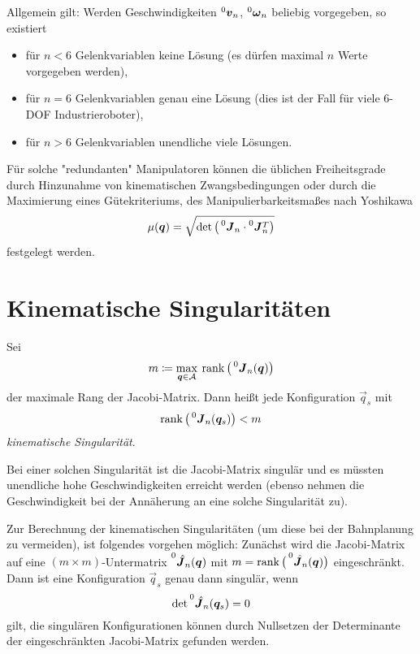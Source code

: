		Allgemein gilt: Werden Geschwindigkeiten \( \prescript{0}{}{\bm{v}}_n \), \( \prescript{0}{}{\bm{\omega}}_n \) beliebig vorgegeben, so existiert
		\begin{itemize}
			\item für \( n < 6 \) Gelenkvariablen \iA keine Lösung (es dürfen maximal \(n\) Werte vorgegeben werden),
			\item für \( n = 6 \) Gelenkvariablen \iA genau eine Lösung (dies ist der Fall für viele \num{6}-DOF Industrieroboter),
			\item für \( n > 6 \) Gelenkvariablen \iA unendliche viele Lösungen.
		\end{itemize}
		Für solche "redundanten" Manipulatoren können die üblichen Freiheitsgrade \zB durch Hinzunahme von kinematischen Zwangsbedingungen oder durch die Maximierung eines Gütekriteriums, \zB des Manipulierbarkeitsmaßes nach Yoshikawa
		\begin{equation*}
			\mu(\bm{q}) = \sqrt{\det \big( \prescript{0}{}{\bm{J}}_n \cdot \prescript{0}{}{\bm{J}}_n^T \big)}
		\end{equation*}
		festgelegt werden.

	\section{Kinematische Singularitäten}
		Sei
		\begin{equation*}
			m \coloneqq \max_{\bm{q} \in \mathcal{A}} \> \rank\big(\prescript{0}{}{\bm{J}}_n(\bm{q})\big)
		\end{equation*}
		der maximale Rang der Jacobi-Matrix. Dann heißt jede Konfiguration \(\vec{q}_s\) mit
		\begin{equation*}
			\rank\big(\prescript{0}{}{\bm{J}}_n(\bm{q}_s)\big) < m
		\end{equation*}
		\emph{kinematische Singularität}.

		Bei einer solchen Singularität ist die Jacobi-Matrix singulär und es müssten unendliche hohe Geschwindigkeiten erreicht werden (ebenso nehmen die Geschwindigkeit bei der Annäherung an eine solche Singularität \iA zu).

		Zur Berechnung der kinematischen Singularitäten (\zB um diese bei der Bahnplanung zu vermeiden), ist folgendes vorgehen möglich: Zunächst wird die Jacobi-Matrix auf eine \( (m \times m) \)-Untermatrix \( \prescript{0}{}{\hat{\bm{J}}}_n(\bm{q}) \) mit \( m = \rank\big(\prescript{0}{}{\hat{\bm{J}}}_n(\bm{q})\big) \) eingeschränkt. Dann ist eine Konfiguration \(\vec{q}_s\) genau dann singulär, wenn
		\begin{equation*}
			\det \prescript{0}{}{\hat{\bm{J}}}_n(\bm{q}_s) = 0
		\end{equation*}
		gilt, \dh die singulären Konfigurationen können durch Nullsetzen der Determinante der eingeschränkten Jacobi-Matrix gefunden werden.

